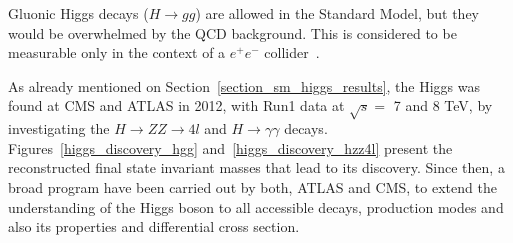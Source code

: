 Gluonic Higgs decays ($H \rightarrow gg$) are allowed in the Standard Model, but they would be overwhelmed by the QCD background. This is considered to be measurable only in the context of a $e^{+}e^{-}$ collider~\cite{Spira:1995rr}.

As already mentioned on Section~\ref{section_sm_higgs_results}, the Higgs was found at CMS and ATLAS in 2012, with Run1 data at $\sqrt{s} =$ 7 and 8 TeV, by investigating the $H \rightarrow ZZ \rightarrow 4l$ and $H \rightarrow \gamma\gamma$ decays. Figures~\ref{higgs_discovery_hgg} and~\ref{higgs_discovery_hzz4l} present the reconstructed final state invariant masses that lead to its discovery. Since then, a broad program have been carried out by both, ATLAS and CMS, to extend the understanding of the Higgs boson to all accessible decays, production modes and also its properties and differential cross section.

